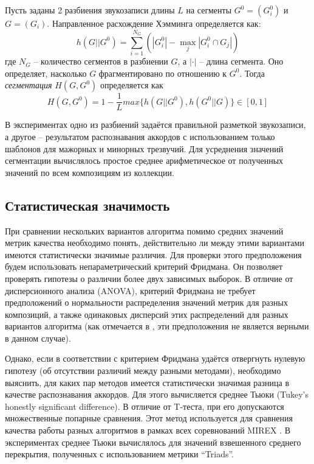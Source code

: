 Пусть заданы 2 разбиения звукозаписи длины $L$ на сегменты $G^0 = (G_i^0)$ и $G
= (G_i)$. Направленное расхождение Хэмминга определяется как:
$$
h(G||G^0) = \sum_{i=1}^{N_G} \left( |G_i^0| - \underset{j}{\operatorname{max}}
|G_i^0 \cap G_j| \right)
$$
где $N_G$ -- количество сегментов в разбиении $G$, а $| \cdot |$ -- длина
сегмента. Оно определяет, насколько $G$ фрагментировано по отношению к $G^0$.
Тогда \emph{сегментация} $H(G, G^0)$ определяется как
$$H(G, G^0) = 1 - \frac{1}{L} max\{ h(G||G^0), h(G^0||G) \} \in [0,1]$$

В экспериментах одно из разбиений задаётся правильной разметкой звукозаписи, а
другое -- результатом распознавания аккордов с использованием только шаблонов
для мажорных и минорных трезвучий. Для усреднения значений сегментации
вычислялось простое среднее арифметическое от полученных значений по всем
композициям из коллекции.

\subsection{Статистическая значимость}

При сравнении нескольких вариантов алгоритма помимо средних значений метрик
качества необходимо понять, действительно ли между этими вариантами имеются
статистически значимые различия. Для проверки этого предположения будем
использовать непараметрический критерий Фридмана. Он позволяет проверять
гипотезы о различии более двух зависимых выборок. В отличие от дисперсионного
анализа (ANOVA), критерий Фридмана не требует предположений о нормальности
распределения значений метрик для разных композиций, а также одинаковых
дисперсий этих распределений для разных вариантов алгоритма (как отмечается в
\cite{Mauch2010}, эти предположения не является верными в данном случае).

Однако, если в соответствии с критерием Фридмана удаётся отвергнуть нулевую
гипотезу (об отсутствии различий между разными методами), необходимо выяснить,
для каких пар методов имеется статистически значимая разница в качестве
распознавания аккордов. Для этого вычисляется среднее Тьюки (Tukey's honestly
significant difference). В отличие от T-теста, при его допускаются множественные
попарные сравнения. Этот метод используется для сравнения качества работы разных
алгоритмов в рамках всех соревнований MIREX \cite{Downie2008}. В экспериментах
среднее Тьюки вычислялось для значений взвешенного среднего перекрытия,
полученных с использованием метрики ``Triads''.

